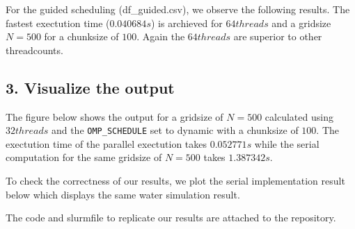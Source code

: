 \documentclass[a4paper,10pt]{article}
\begin{document}
For the guided scheduling (df_guided.csv), we observe the following results. The fastest exectution time ($0.040684 s$) is archieved for $64 threads$ and a gridsize $N=500$ for a chunksize of $100$.
Again the $64 threads$ are superior to other threadcounts.


\subsection{3. Visualize the output}
The figure below shows the output for a gridsize of $N=500$ calculated using $32 threads$ and the \verb|OMP_SCHEDULE| set to dynamic with a 
chunksize of $ 100 $.
The exectution time of the parallel exectution takes $0.052771s$ while the serial computation for the same gridsize of $N=500$ takes $1.387342s$.  

\begin{figure}
  \label{ex5parallel}
\end{figure}

To check the correctness of our results, we plot the serial implementation result below which displays the same water simulation result.
\begin{figure}
  \label{ex5serial}
\end{figure}

The code and slurmfile to replicate our results are attached to the repository.

\end{document}
